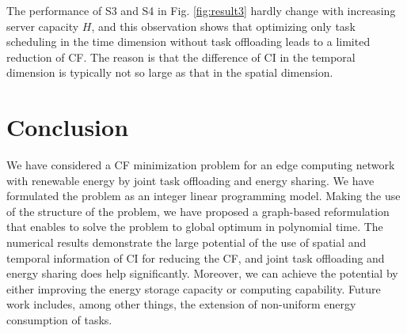 \documentclass[conference, 10pt, ﬁnal, letterpaper, twocolumn]{IEEEtran}
\begin{document}
The performance of S3 and S4 in Fig. \ref{fig:result3} hardly change with increasing server capacity $H$, and this observation shows that optimizing only task scheduling in the time dimension without task offloading leads to a limited reduction of CF. The reason is that the difference of CI in the temporal dimension is typically not so large as that in the spatial dimension.


\section{Conclusion} \label{Sec:conclusion}
We have considered a CF minimization problem for an edge computing network with renewable energy by joint task offloading and energy sharing. We have formulated the problem as an integer linear programming model. Making the use of the structure of the problem, we have proposed a graph-based reformulation that enables to solve the problem to global optimum in polynomial time. The numerical results demonstrate the large potential of the use of spatial and temporal information of CI for reducing the CF, and joint task offloading and energy sharing does help significantly. Moreover, we can achieve the potential by either improving the energy storage capacity or computing capability. Future work includes, among other things, the extension of non-uniform energy consumption of tasks.



\end{document}
